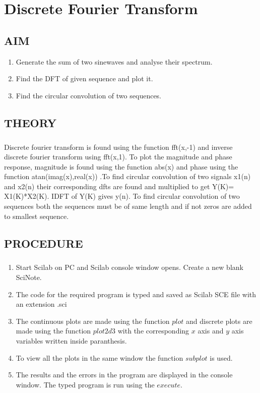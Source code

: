 \chapter [Discrete Fourier Transform]{Discrete Fourier Transform}


\section{AIM}
\begin{enumerate}
\item
Generate the sum of two sinewaves and analyse their spectrum.
\item
Find the DFT of given sequence and plot it.

\item
Find the circular convolution of two sequences.


\end{enumerate}
\section{THEORY}
\paragraph{}

Discrete fourier transform is found using the function fft(x,-1) and inverse discrete fourier transform using fft(x,1). To plot the magnitude and phase response, magnitude is found using the function abs(x) and phase using the function atan(imag(x),real(x)) .To find circular convolution of two signals x1(n) and x2(n) their corresponding dfts are found and multiplied to get Y(K)= X1(K)*X2(K).  IDFT of Y(K) gives y(n). To find circular convolution of two sequences both the sequences must be of same length and if not zeros are added to smallest sequence. 
\section{PROCEDURE}

\paragraph{}
\begin{enumerate}
\item
Start Scilab on PC and Scilab console window opens. Create a new blank SciNote.
\item
The code for the required program is typed and saved as Scilab SCE file with an extension .sci
\item

The continuous plots are made using the function $plot$ and discrete plots are made using the function $plot2d3$ with the corresponding $x$ axis and $y$ axis variables written inside paranthesis.

\item
To view all the plots in the same window the function $subplot$ is used.
\item
The results and the errors in the program are displayed in the console window.
The typed program is run using the $execute$.
\end{enumerate}

